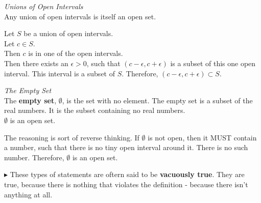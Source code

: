 \documentclass{ximera}
\begin{document}
\begin{example}  \textit{Unions of Open Intervals} \\


Any union of open intervals is itself an open set.



\begin{explanation}

Let $S$ be a union of open intervals.  \\
Let $c \in S$. \\
Then $c$ is in one of the open intervals. \\
Then there exists an $\epsilon > 0$, such that $(c - \epsilon, c + \epsilon)$ is a subset of this one open interval.  This interval is a subset of $S$.  Therefore, $(c - \epsilon, c + \epsilon) \subset S$. \\


\end{explanation}

\end{example}















\begin{example}  \textit{The Empty Set} \\


The \textbf{empty set}, $\emptyset$, is the set with no element.  The empty set is a subset of the real numbers.  It is the subset containing no real numbers. \\


$\emptyset$ is an open set. \\



\begin{explanation}


The reasoning is sort of reverse thinking.  If $\emptyset$ is not open, then it MUST contain a number, such that there is no tiny open interval around it.  There is no such number.  Therefore, $\emptyset$ is an open set.


\end{explanation}

\end{example}

$\blacktriangleright$ These types of statements are oftern said to be \textbf{vacuously true}.  They are true, because there is nothing that violates the definition - because there isn't anything at all. 
\end{document}
